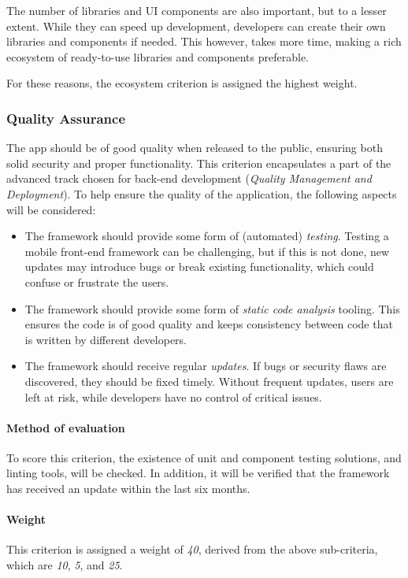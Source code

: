 The number of libraries and UI components are also important, but to a lesser extent.
While they can speed up development, developers can create their own libraries and components if needed.
This however, takes more time, making a rich ecosystem of ready-to-use libraries and components preferable.

For these reasons, the ecosystem criterion is assigned the highest weight.

\subsubsection{Quality Assurance}\label{subsubsec:quality-assurance}
The app should be of good quality when released to the public, ensuring both solid security and proper functionality.
This criterion encapsulates a part of the advanced track chosen for back-end development (\emph{Quality Management and Deployment}).
To help ensure the quality of the application, the following aspects will be considered:

\begin{itemize}
	\item The framework should provide some form of (automated) \emph{testing}.
	      Testing a mobile front-end framework can be challenging, but if this is not done, new updates may introduce bugs or break existing functionality, which could confuse or frustrate the users.
	\item The framework should provide some form of \emph{static code analysis} tooling.
	      This ensures the code is of good quality and keeps consistency between code that is written by different developers.
	\item The framework should receive regular \emph{updates}.
	      If bugs or security flaws are discovered, they should be fixed timely.
	      Without frequent updates, users are left at risk, while developers have no control of critical issues.
\end{itemize}

\paragraph{Method of evaluation}
To score this criterion, the existence of unit and component testing solutions, and linting tools, will be checked.
In addition, it will be verified that the framework has received an update within the last six months.

\paragraph{Weight}
This criterion is assigned a weight of \emph{40}, derived from the above sub-criteria, which are \emph{10}, \emph{5}, and \emph{25}.


